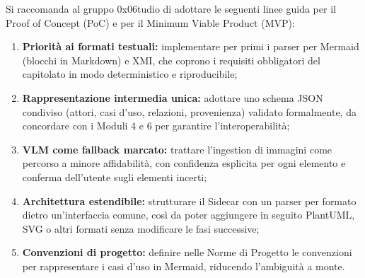 \documentclass[a4paper, 11pt]{article}
\begin{document}
Si raccomanda al gruppo 0x06tudio di adottare le seguenti linee guida per il Proof of Concept (PoC) e per il Minimum Viable Product (MVP):

\begin{enumerate}
    \item \textbf{Priorità ai formati testuali:} implementare per primi i parser per Mermaid (blocchi in Markdown) e XMI, che coprono i requisiti obbligatori del capitolato in modo deterministico e riproducibile;
    \item \textbf{Rappresentazione intermedia unica:} adottare uno schema JSON condiviso (attori, casi d'uso, relazioni, provenienza) validato formalmente, da concordare con i Moduli 4 e 6 per garantire l'interoperabilità;
    \item \textbf{VLM come fallback marcato:} trattare l'ingestion di immagini come percorso a minore affidabilità, con confidenza esplicita per ogni elemento e conferma dell'utente sugli elementi incerti;
    \item \textbf{Architettura estendibile:} strutturare il Sidecar con un parser per formato dietro un'interfaccia comune, così da poter aggiungere in seguito PlantUML, SVG o altri formati senza modificare le fasi successive;
    \item \textbf{Convenzioni di progetto:} definire nelle Norme di Progetto le convenzioni per rappresentare i casi d'uso in Mermaid, riducendo l'ambiguità a monte.
\end{enumerate}
\end{document}
